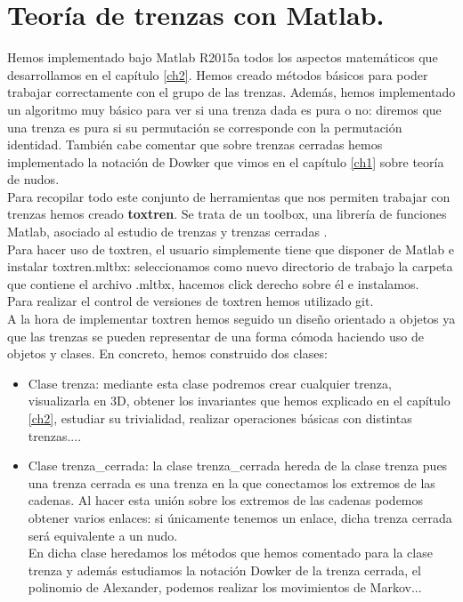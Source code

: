 \newpage
\section{Teoría de trenzas con Matlab.}
Hemos implementado bajo Matlab R2015a todos los aspectos matemáticos que desarrollamos en el capítulo \ref{ch2}. Hemos creado métodos básicos para poder trabajar correctamente con el grupo de las trenzas. Además, hemos implementado un algoritmo muy básico para ver si una trenza dada es pura o no: diremos que una trenza es pura si su permutación se corresponde con la permutación identidad. También cabe comentar que sobre trenzas cerradas hemos implementado la notación de Dowker que vimos en el capítulo \ref{ch1} sobre teoría de nudos. \\

Para recopilar todo este conjunto de herramientas que nos permiten trabajar con trenzas hemos creado \textbf{toxtren}. Se trata de un toolbox, una librería de funciones Matlab, asociado al estudio de trenzas y trenzas cerradas \cite{6}.  \\ 

Para hacer uso de toxtren, el usuario simplemente tiene que disponer de Matlab e instalar toxtren.mltbx: seleccionamos como nuevo directorio de trabajo la carpeta que contiene el archivo .mltbx, hacemos click derecho sobre él e instalamos. \\

Para realizar el control de versiones de toxtren hemos utilizado git.\\

A la hora de implementar toxtren hemos seguido un diseño orientado a objetos ya que las trenzas se pueden representar de una forma cómoda haciendo uso de objetos y clases. En concreto, hemos construido dos clases: 
\begin{itemize}
	\item Clase trenza: mediante esta clase podremos crear cualquier trenza, visualizarla en 3D, obtener los invariantes que hemos explicado en el capítulo \ref{ch2}, estudiar su trivialidad, realizar operaciones básicas con distintas trenzas....
	\item Clase trenza\_cerrada: la clase trenza\_cerrada hereda de la clase trenza pues una trenza cerrada es una trenza en la que conectamos los extremos de las cadenas. Al hacer esta unión sobre los extremos de las cadenas podemos obtener varios enlaces: si únicamente tenemos un enlace, dicha trenza cerrada será equivalente a un nudo. \\
	En dicha clase heredamos los métodos que hemos comentado para la clase trenza y además estudiamos la notación Dowker de la trenza cerrada, el polinomio de Alexander, podemos realizar los movimientos de Markov...
\end{itemize} 

